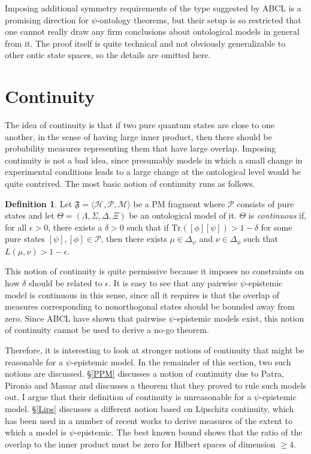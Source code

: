 \documentclass[DIV=calc,fontsize=12pt]{scrartcl} %
\theoremstyle{definition}
\newtheorem{definition}{Definition}[section]
\theoremstyle{plain}
\newcommand{\Proj}[1]{\ensuremath{\left [ #1 \right ]}}
\newcommand{\Hilb}[1][]{\ensuremath{\mathcal{H}_{#1}}}
\newcommand{\Tr}[2][]{\ensuremath{\text{Tr}_{#1} \left ( #2 \right )}}
\begin{document}
Imposing additional symmetry requirements of the type suggested by
ABCL is a promising direction for $\psi$-ontology theorems, but their
setup is so restricted that one cannot really draw any firm
conclusions about ontological models in general from it.  The proof
itself is quite technical and not obviously generalizable to other
ontic state spaces, so the details are omitted here.

\section{Continuity}

\label{Cont}

The idea of continuity is that if two pure quantum states are close to
one another, in the sense of having large inner product, then there
should be probability measures representing them that have large
overlap.  Imposing continuity is not a bad idea, since presumably
models in which a small change in experimental conditions leads to a
large change at the ontological level would be quite contrived.  The
most basic notion of continuity runs as follows.

\begin{definition}
\label{def:Cont:cont}
Let $\mathfrak{F} = \langle \Hilb, \mathcal{P}, \mathcal{M} \rangle$
be a PM fragment where $\mathcal{P}$ consists of pure states and let
$\Theta = (\Lambda, \Sigma, \Delta, \Xi)$ be an ontological model of
it.  $\Theta$ is \emph{continuous} if, for all $\epsilon > 0$, there
exists a $\delta > 0$ such that if $\Tr{\Proj{\phi}\Proj{\psi}} > 1
- \delta$ for some pure states $\Proj{\psi}, \Proj{\phi} \in
\mathcal{P}$, then there exists $\mu \in \Delta_{\psi}$ and $\nu \in
\Delta_{\phi}$ such that $L(\mu,\nu) > 1 - \epsilon$.
\end{definition}

This notion of continuity is quite permissive because it imposes no
constraints on how $\delta$ should be related to $\epsilon$.  It is
easy to see that any pairwise $\psi$-epistemic model is continuous in
this sense, since all it requires is that the overlap of measures
corresponding to nonorthogonal states should be bounded away from
zero.  Since ABCL have shown that pairwise $\psi$-epistemic models
exist, this notion of continuity cannot be used to derive a no-go
theorem.

Therefore, it is interesting to look at stronger notions of continuity
that might be reasonable for a $\psi$-epistemic model.  In the
remainder of this section, two such notions are discussed.
\S\ref{PPM} discusses a notion of continuity due to Patra, Pironio and
Massar \cite{Patra2013a} and discusses a theorem that they proved to
rule such models out.  I argue that their definition of continuity is
unreasonable for a $\psi$-epistemic model.  \S\ref{Lips} discusses a
different notion based on Lipschitz continuity, which has been used in
a number of recent works to derive measures of the extent to which a
model is $\psi$-epistemic.  The best known bound shows that the ratio
of the overlap to the inner product must be zero for Hilbert spaces of
dimension $\geq 4$.
\end{document}
